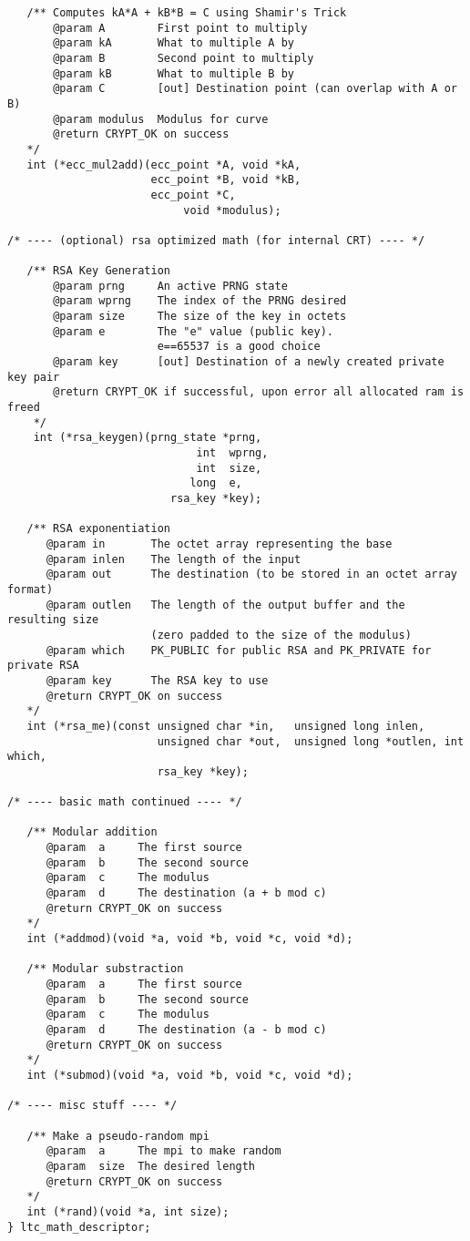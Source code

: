 \documentclass[synpaper]{book}
\begin{document}
\begin{small}
\begin{verbatim}
   /** Computes kA*A + kB*B = C using Shamir's Trick
       @param A        First point to multiply
       @param kA       What to multiple A by
       @param B        Second point to multiply
       @param kB       What to multiple B by
       @param C        [out] Destination point (can overlap with A or B)
       @param modulus  Modulus for curve
       @return CRYPT_OK on success
   */
   int (*ecc_mul2add)(ecc_point *A, void *kA,
                      ecc_point *B, void *kB,
                      ecc_point *C,
                           void *modulus);

/* ---- (optional) rsa optimized math (for internal CRT) ---- */

   /** RSA Key Generation
       @param prng     An active PRNG state
       @param wprng    The index of the PRNG desired
       @param size     The size of the key in octets
       @param e        The "e" value (public key).
                       e==65537 is a good choice
       @param key      [out] Destination of a newly created private key pair
       @return CRYPT_OK if successful, upon error all allocated ram is freed
    */
    int (*rsa_keygen)(prng_state *prng,
                             int  wprng,
                             int  size,
                            long  e,
                         rsa_key *key);

   /** RSA exponentiation
      @param in       The octet array representing the base
      @param inlen    The length of the input
      @param out      The destination (to be stored in an octet array format)
      @param outlen   The length of the output buffer and the resulting size
                      (zero padded to the size of the modulus)
      @param which    PK_PUBLIC for public RSA and PK_PRIVATE for private RSA
      @param key      The RSA key to use
      @return CRYPT_OK on success
   */
   int (*rsa_me)(const unsigned char *in,   unsigned long inlen,
                       unsigned char *out,  unsigned long *outlen, int which,
                       rsa_key *key);

/* ---- basic math continued ---- */

   /** Modular addition
      @param  a     The first source
      @param  b     The second source
      @param  c     The modulus
      @param  d     The destination (a + b mod c)
      @return CRYPT_OK on success
   */
   int (*addmod)(void *a, void *b, void *c, void *d);

   /** Modular substraction
      @param  a     The first source
      @param  b     The second source
      @param  c     The modulus
      @param  d     The destination (a - b mod c)
      @return CRYPT_OK on success
   */
   int (*submod)(void *a, void *b, void *c, void *d);

/* ---- misc stuff ---- */

   /** Make a pseudo-random mpi
      @param  a     The mpi to make random
      @param  size  The desired length
      @return CRYPT_OK on success
   */
   int (*rand)(void *a, int size);
} ltc_math_descriptor;
\end{verbatim}
\end{small}
\end{document}
